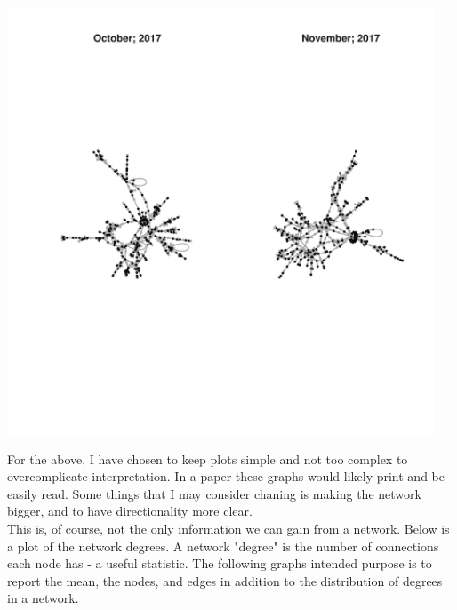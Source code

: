 \documentclass[12pt]{article}\usepackage[]{graphicx}\usepackage[]{color}
\newenvironment{knitrout}{}{} %
\begin{document}
\begin{flushleft}
\begin{center}
\begin{knitrout}
\includegraphics[width=5in]{figure/plot2-1} 

\end{knitrout}
\end{center}

For the above, I have chosen to keep plots simple and not too complex to overcomplicate interpretation. In a paper these graphs would likely print and be easily read. Some things that I may consider chaning is making the network bigger, and to have directionality more clear.\\

This is, of course, not the only information we can gain from a network. Below is a plot of the network degrees. A network "degree" is the number of connections each node has - a useful statistic. The following graphs intended purpose is to report the mean, the nodes, and edges in addition to the distribution of degrees in a network.


\end{flushleft}
\end{document}

